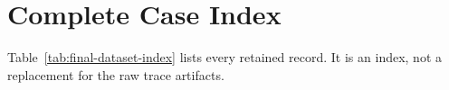 \section{Complete Case Index}

Table~\ref{tab:final-dataset-index} lists every retained record. It is an index, not a replacement for the raw trace artifacts.


